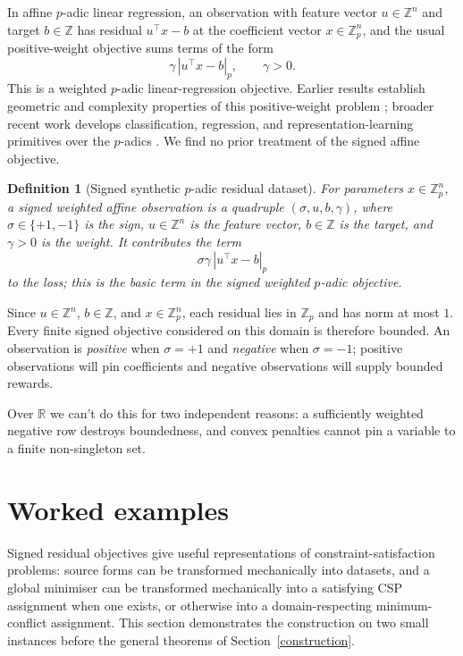 \documentclass[11pt]{article}
\newtheorem{definition}{Definition}
\begin{document}
In affine \(p\)-adic linear regression, an observation with feature vector \(u\in\mathbb Z^n\) and target \(b\in\mathbb Z\) has residual \(u^\top x-b\) at the coefficient vector \(x\in\mathbb Z_p^n\), and the usual positive-weight objective sums terms of the form
\[
\gamma\,|u^\top x-b|_p,
\qquad \gamma>0.
\]
This is a weighted \(p\)-adic linear-regression objective.
Earlier results establish geometric and complexity properties of this positive-weight problem \cite{baker2025padic,baker2026nphard}; broader recent work develops classification, regression, and representation-learning primitives over the \(p\)-adics \cite{martins2025learning}. We find no prior treatment of the signed affine objective.

\begin{definition}[Signed synthetic $p$-adic residual dataset]
\label{def:signed-dataset}
For parameters \(x\in \mathbb Z_p^n\), a signed weighted affine observation is a quadruple \((\sigma,u,b,\gamma)\), where \(\sigma\in\{+1,-1\}\) is the sign, \(u\in\mathbb Z^n\) is the feature vector, \(b\in\mathbb Z\) is the target, and \(\gamma>0\) is the weight. It contributes the term
\[
\sigma\gamma\,|u^\top x-b|_p
\]
to the loss; this is the basic term in the signed weighted $p$-adic objective.
\end{definition}

Since \(u\in\mathbb Z^n\), \(b\in\mathbb Z\), and \(x\in\mathbb Z_p^n\), each residual lies in \(\mathbb Z_p\) and has norm at most \(1\). Every finite signed objective considered on this domain is therefore bounded. An observation is \emph{positive} when \(\sigma=+1\) and \emph{negative} when \(\sigma=-1\); positive observations will pin coefficients and negative observations will supply bounded rewards.

Over \(\mathbb R\) we can't do this for two independent reasons: a sufficiently weighted negative row destroys boundedness, and convex penalties cannot pin a variable to a finite non-singleton set.


\section{Worked examples}
\label{sec:padic-regression-background}

Signed residual objectives give useful representations of constraint-satisfaction problems: source forms can be transformed mechanically into datasets, and a global minimiser can be transformed mechanically into a satisfying CSP assignment when one exists, or otherwise into a domain-respecting minimum-conflict assignment. This section demonstrates the construction on two small instances before the general theorems of Section~\ref{construction}.
\end{document}
